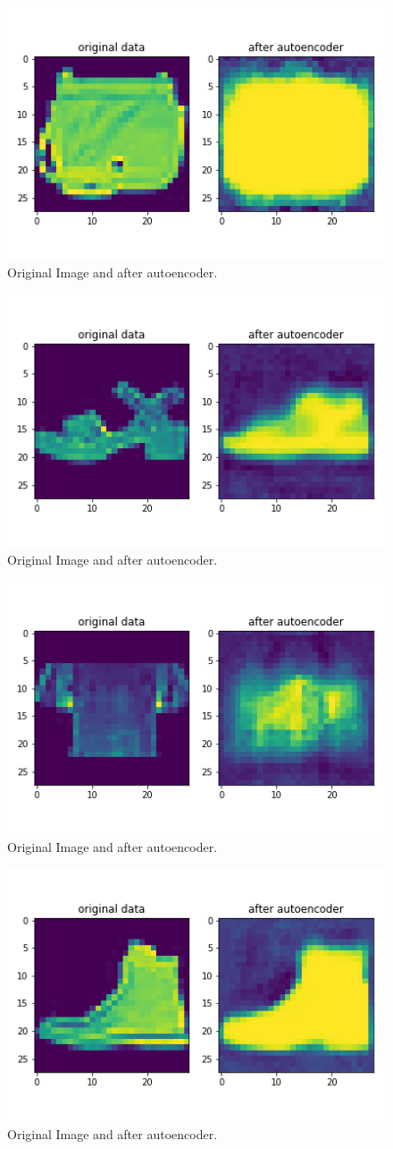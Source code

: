 \documentclass[11pt,a4paper,oneside]{article}
\begin{document}
\begin{figure}[!btp]
	\centering
	\includegraphics[width=.6\textwidth]{figures/save_ev_1}
	\caption{Original Image and after autoencoder.}
\end{figure}
\begin{figure}[!btp]
	\centering
	\includegraphics[width=.6\textwidth]{figures/save_ev_2}
	\caption{Original Image and after autoencoder.}
\end{figure}
\begin{figure}[!btp]
	\centering
	\includegraphics[width=.6\textwidth]{figures/save_ev_3}
	\caption{Original Image and after autoencoder.}
\end{figure}
\begin{figure}[!btp]
	\centering
	\includegraphics[width=.6\textwidth]{figures/save_ev_4}
	\caption{Original Image and after autoencoder.}
\end{figure}
\end{document}
